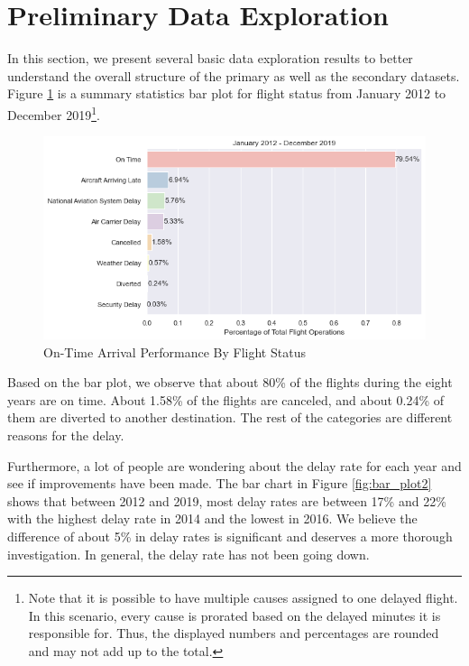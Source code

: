 \documentclass[11pt, letterpaper]{article}
\begin{document}
\section{Preliminary Data Exploration}\label{sec:da}
In this section, we present several basic data exploration results to better understand the overall structure of the primary as well as the secondary datasets. Figure \ref{fig:bar_plot1} is a summary statistics bar plot for flight status from January 2012 to December 2019\footnote{Note that it is possible to have multiple causes assigned to one delayed flight. In this scenario, every cause is prorated based on the delayed minutes it is responsible for. Thus, the displayed numbers and percentages are rounded and may not add up to the total.}.

\begin{figure}[h!]
\centering
\includegraphics[width = \textwidth]{bar_plot1}
\caption{On-Time Arrival Performance By Flight Status}\label{fig:bar_plot1}
\end{figure}

Based on the bar plot, we observe that about 80\% of the flights during the eight years are on time. About 1.58\% of the flights are canceled, and about 0.24\% of them are diverted to another destination. The rest of the categories are different reasons for the delay. 

Furthermore, a lot of people are wondering about the delay rate for each year and see if improvements have been made. The bar chart in Figure \ref{fig:bar_plot2} shows that between 2012 and 2019, most delay rates are between 17\% and 22\% with the highest delay rate in 2014 and the lowest in 2016. We believe the difference of about 5\% in delay rates is significant and deserves a more thorough investigation. In general, the delay rate has not been going down.
\end{document}
